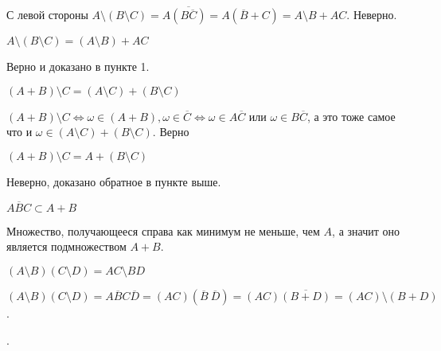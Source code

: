 \begin{solution}
С левой стороны $A \setminus \left( B \setminus C \right) = A \overline{\left( 
B  \overline{C}\right) } = A \left( \overline{B} + C \right) = A \setminus B + A C$. Неверно.
\end{solution}


\begin{subtask}{2}
$A \setminus \left( B \setminus C \right) = \left( A \setminus B \right) + AC$
\end{subtask}

\begin{solution}
Верно и доказано в пункте 1.
\end{solution}


\begin{subtask}{3}
 $\left( A + B \right) \setminus C = \left( A \setminus C \right) + \left( B \setminus C \right) $ 
\end{subtask}

\begin{solution}
$\left( A + B \right) \setminus C \Leftrightarrow \omega \in \left(A + B\right),
\omega \in \overline{C} \Leftrightarrow \omega \in A\overline{C} $ или $ \omega \in B\overline{C}$, 
а это тоже самое что и $\omega \in \left(A \setminus C\right) + \left(B \setminus C\right)$. Верно
\end{solution}


\begin{subtask}{4}
$\left( A + B \right)  \setminus C = A + \left( B \setminus C \right) $
\end{subtask}

\begin{solution}
Неверно, доказано обратное в пункте выше.
\end{solution}


\begin{subtask}{5}
$A\overline{B}C \subset A + B$
\end{subtask}

\begin{solution}
Множество, получающееся справа как минимум не меньше, чем $A$, а значит оно является 
подмножеством $A + B$.
\end{solution}


\begin{subtask}{6}
$\left(A \setminus B\right)\left(C \setminus D\right) = AC \setminus BD$
\end{subtask}

\begin{solution}
$\left(A \setminus B\right) \left(C \setminus D\right) = A\overline{B}C\overline{D} =
\left(AC\right)\left(\overline{B}~\overline{D}\right) = \left(AC\right)\overline{\left(
B + D\right)} = \left(AC\right) \setminus \left(B + D\right)$.

.
\end{solution}



